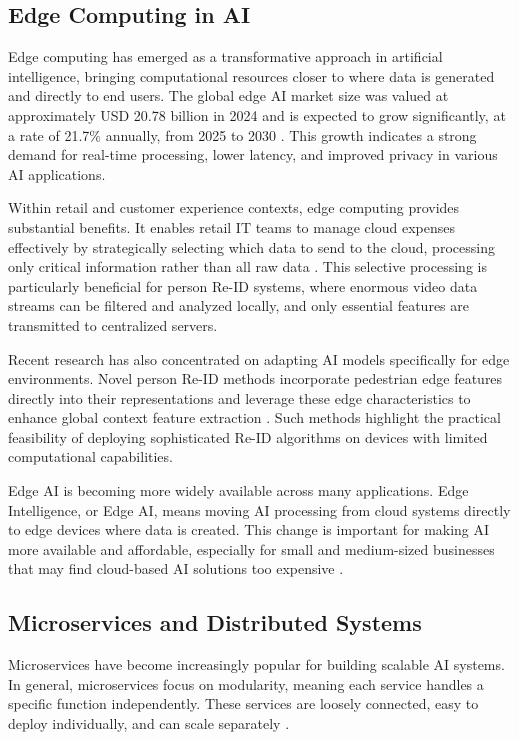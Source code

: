 \documentclass[../main.tex]{subfiles}
\begin{document}
\subsection{Edge Computing in AI}
\label{sec:edgecomputing}

Edge computing has emerged as a transformative approach in artificial intelligence, bringing computational resources closer to where data is generated and directly to end users. The global edge AI market size was valued at approximately USD 20.78 billion in 2024 and is expected to grow significantly, at a rate of 21.7\% annually, from 2025 to 2030 \cite{grandview2024}. This growth indicates a strong demand for real-time processing, lower latency, and improved privacy in various AI applications.

Within retail and customer experience contexts, edge computing provides substantial benefits. It enables retail IT teams to manage cloud expenses effectively by strategically selecting which data to send to the cloud, processing only critical information rather than all raw data \cite{biztech2024}. This selective processing is particularly beneficial for person Re-ID systems, where enormous video data streams can be filtered and analyzed locally, and only essential features are transmitted to centralized servers.

Recent research has also concentrated on adapting AI models specifically for edge environments. Novel person Re-ID methods incorporate pedestrian edge features directly into their representations and leverage these edge characteristics to enhance global context feature extraction \cite{mdpi2024_edge}. Such methods highlight the practical feasibility of deploying sophisticated Re-ID algorithms on devices with limited computational capabilities.

Edge AI is becoming more widely available across many applications. Edge Intelligence, or Edge AI, means moving AI processing from cloud systems directly to edge devices where data is created. This change is important for making AI more available and affordable, especially for small and medium-sized businesses that may find cloud-based AI solutions too expensive \cite{viso2024}.


\subsection{Microservices and Distributed Systems}
\label{sec:microservice}

Microservices have become increasingly popular for building scalable AI systems. In general, microservices focus on modularity, meaning each service handles a specific function independently. These services are loosely connected, easy to deploy individually, and can scale separately \cite{wiki2024_microservices}.
\end{document}
